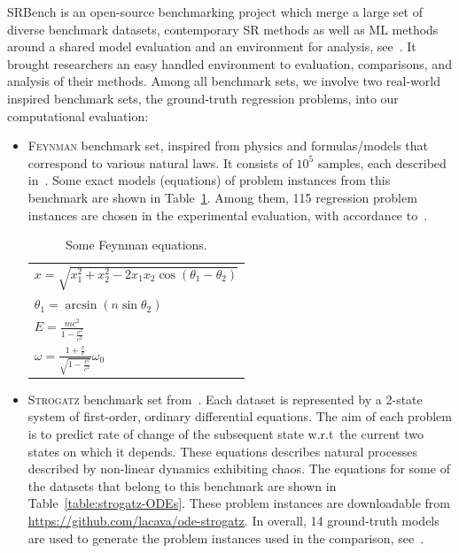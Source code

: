 \documentclass[a4paper,12pt]{elsarticle}
\begin{document}
SRBench is an open-source benchmarking project which merge a large set of diverse benchmark datasets, contemporary SR methods as well as ML methods around a shared model evaluation and an environment for analysis, see~\cite{la2021contemporary}. It brought researchers an easy handled environment to evaluation, comparisons, and analysis of their methods. Among all benchmark sets, we involve two real-world inspired benchmark sets, the ground-truth regression problems, into our computational evaluation: 
\begin{itemize}
	\item \textsc{Feynman} benchmark set, inspired from physics and formulas/models that correspond to various natural laws.  
	It consists of $10^5$  samples, each described in~\cite{udrescu2020ai}. Some exact models (equations) of problem instances from this benchmark are shown in Table~\ref{tab:Feynamn-Eq}.  Among them, 115 regression problem instances are chosen in the experimental evaluation, with accordance to~\cite{la2021contemporary}. 
	
	\begin{table}[!ht]
		\centering
		\begin{tabular}{l}   \hline
			$x = \sqrt{x_1^2 + x_2^2 - 2 x_1 x_2 \cos(\theta_1 - \theta_2)}$ \\
			$ \theta_1 = \arcsin(n \sin \theta_2)$ \\
			$E =  \frac{m c^2 }{1 - \frac{v^2}{c^2}}$ \\
			$\omega = \frac{1 + \frac{v}{c}}{ \sqrt{1 - \frac{v^2}{c^2}}} \omega_0$ \\ \hline
			
		\end{tabular}
		\caption{Some Feynman equations.}
		\label{tab:Feynamn-Eq}
	\end{table}
	
	
	\item \textsc{Strogatz} benchmark set from~\cite{la2016inference}. 
	Each dataset is represented by a 2-state system of first-order, ordinary differential equations. 
	The aim of each problem is to predict rate of change of the subsequent state w.r.t\  the current two states on which it depends. These equations describes natural processes described by non-linear dynamics  exhibiting chaos.  The equations for some of the datasets that belong to this benchmark are shown in Table~\ref{table:strogatz-ODEs}. These problem instances are downloadable from \url{https://github.com/lacava/ode-strogatz}. In overall, 14 ground-truth models are used to generate the problem instances used in the comparison, see~\cite{la2021contemporary}. 
	

\end{itemize}
\end{document}
